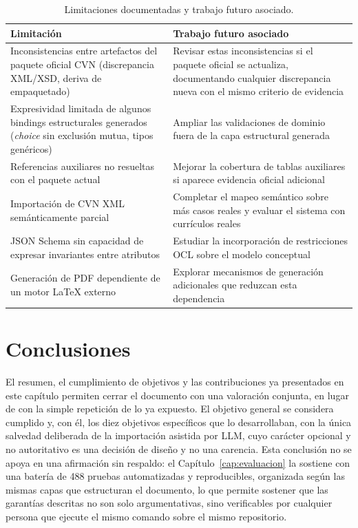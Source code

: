 \begin{table}[htbp]
  \centering
  \small
  \renewcommand{\arraystretch}{1.2}
  \begin{tabular}{p{} p{}}
    \hline
    \textbf{Limitación} & \textbf{Trabajo futuro asociado} \\
    \hline
    Inconsistencias entre artefactos del paquete oficial CVN (discrepancia
    XML/XSD, deriva de empaquetado) & Revisar estas inconsistencias si el
    paquete oficial se actualiza, documentando cualquier discrepancia nueva
    con el mismo criterio de evidencia \\
    Expresividad limitada de algunos bindings estructurales generados
    (\textit{choice} sin exclusión mutua, tipos genéricos) & Ampliar las
    validaciones de dominio fuera de la capa estructural generada \\
    Referencias auxiliares no resueltas con el paquete actual & Mejorar la
    cobertura de tablas auxiliares si aparece evidencia oficial adicional \\
    Importación de CVN XML semánticamente parcial & Completar el mapeo
    semántico sobre más casos reales y evaluar el sistema con currículos
    reales \\
    JSON Schema sin capacidad de expresar invariantes entre atributos &
    Estudiar la incorporación de restricciones OCL sobre el modelo
    conceptual \\
    Generación de PDF dependiente de un motor LaTeX externo & Explorar
    mecanismos de generación adicionales que reduzcan esta dependencia \\
    \hline
  \end{tabular}
  \caption{Limitaciones documentadas y trabajo futuro asociado.}
  \label{tab:conclusiones_limitaciones}
\end{table}

\section{Conclusiones}
\label{sec:conclusiones_finales}

El resumen, el cumplimiento de objetivos y las contribuciones ya
presentados en este capítulo permiten cerrar el documento con una
valoración conjunta, en lugar de con la simple repetición de lo ya
expuesto. El objetivo general se considera cumplido y, con él, los diez
objetivos
específicos que lo desarrollaban, con la única salvedad deliberada de la
importación asistida por LLM, cuyo carácter opcional y no autoritativo es
una decisión de diseño y no una carencia. Esta conclusión no se apoya en
una afirmación sin respaldo: el Capítulo~\ref{cap:evaluacion} la sostiene
con una batería de 488 pruebas automatizadas y reproducibles, organizada
según las mismas capas que estructuran el documento, lo que permite
sostener que las garantías descritas no son solo argumentativas, sino
verificables por cualquier persona que ejecute el mismo comando sobre el
mismo repositorio.

